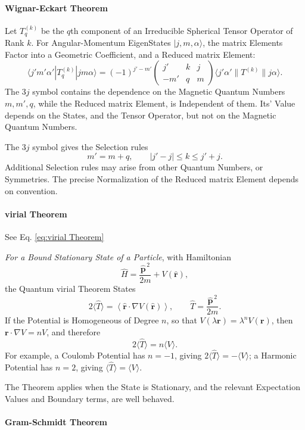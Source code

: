 \documentclass[a4paper, 10pt, onepage]{elegantbook}
\begin{document}
{\paragraph{Wignar-Eckart Theorem}
\label{para:Wignar-Eckart Theorem}
Let $T^{(k)}_q$ be the $q$th component of an Irreducible Spherical Tensor Operator of Rank $k$. For Angular-Momentum 
EigenStates $|j,m,\alpha\rangle$, the matrix Elements Factor into a Geometric Coefficient, and a Reduced matrix Element:
\[
\langle j'm'\alpha'|T^{(k)}_q|jm\alpha\rangle
=
(-1)^{j'-m'}
\begin{pmatrix}
j' & k & j \\
-m' & q & m
\end{pmatrix}
\langle j'\alpha'\|T^{(k)}\|j\alpha\rangle .
\]
The $3j$ symbol contains the dependence on the Magnetic Quantum Numbers $m,m',q$, while the Reduced matrix Element, is 
Independent of them. Its' Value depends on the States, and the Tensor Operator, but not on the Magnetic Quantum 
Numbers.  

The $3j$ symbol gives the Selection rules
\[
m'=m+q,
\qquad
|j'-j|\le k\le j'+j.
\]
Additional Selection rules may arise from other Quantum Numbers, or Symmetries. The precise Normalization of the 
Reduced matrix Element depends on convention.

\paragraph{virial Theorem} See Eq. \eqref{eq:virial Theorem}

\emph{For a Bound Stationary State of a Particle}, with Hamiltonian
\[
\hat{H}=\frac{\hat{\mathbf{p}}^{\,2}}{2m}+V(\hat{\mathbf{r}}),
\]
the Quantum virial Theorem States
\[
2\langle \hat{T}\rangle
=
\left\langle
\hat{\mathbf{r}}\cdot\nabla V(\hat{\mathbf{r}})
\right\rangle,
\qquad
\hat{T}=\frac{\hat{\mathbf{p}}^{\,2}}{2m}.
\]
If the Potential is Homogeneous of Degree $n$, so that $V(\lambda\mathbf{r})=\lambda^nV(\mathbf{r})$, then 
$\mathbf{r}\cdot\nabla V=nV$, and therefore
\[
2\langle \hat{T}\rangle=n\langle V\rangle.
\]
For example, a Coulomb Potential has $n=-1$, giving $2\langle \hat{T}\rangle=-\langle V\rangle$; a Harmonic Potential 
has $n=2$, giving $\langle \hat{T}\rangle=\langle V\rangle$.  

The Theorem applies when the State is Stationary, and the relevant Expectation Values and Boundary terms, are well 
behaved.

\paragraph{Gram-Schmidt Theorem}   

}
\end{document}
